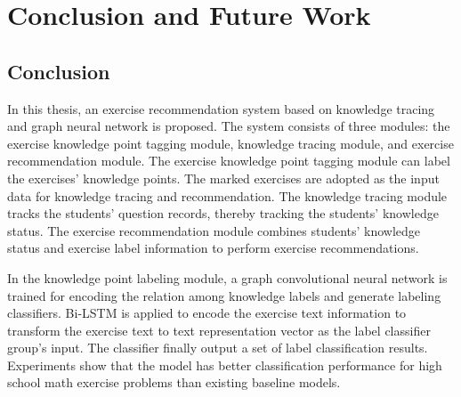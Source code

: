 \chapter{Conclusion and Future Work}
\section{Conclusion}
In this thesis, an exercise recommendation system based on knowledge tracing and graph neural network is proposed. The system consists of three modules: the exercise knowledge point tagging module, knowledge tracing module, and exercise recommendation module. The exercise knowledge point tagging module can label the exercises' knowledge points. The marked exercises are adopted as the input data for knowledge tracing and recommendation. The knowledge tracing module tracks the students' question records, thereby tracking the students' knowledge status. The exercise recommendation module combines students' knowledge status and exercise label information to perform exercise recommendations.


In the knowledge point labeling module, a graph convolutional neural network is trained for encoding the relation among knowledge labels and generate labeling classifiers. Bi-LSTM is applied to encode the exercise text information to transform the exercise text to text representation vector as the label classifier group's input. The classifier finally output a set of label classification results. Experiments show that the model has better classification performance for high school math exercise problems than existing baseline models.

